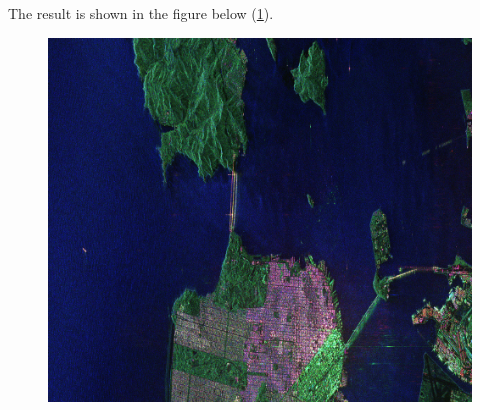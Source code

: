 The result is shown in the figure below (\ref{fig:colorfrisco}).

\begin{center}
  \begin{figure}[h!]
    \includegraphics[width=\textwidth]{../Art/visuPauli.png}
    \label{fig:colorfrisco}
   \end{figure}
\end{center}
